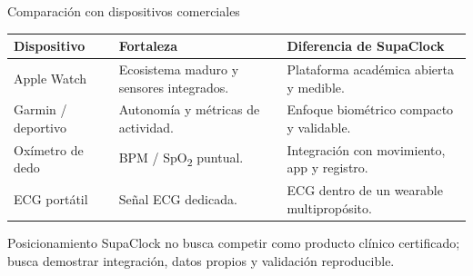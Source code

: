 \documentclass[aspectratio=169, 10pt]{beamer}
\begin{document}
\begin{frame}{Comparación con dispositivos comerciales}
    \scriptsize
    \centering
    \renewcommand{\arraystretch}{1.20}
    \begin{tabular}{p{2.5cm}p{3.1cm}p{5.9cm}}
        \toprule
        \textbf{Dispositivo} & \textbf{Fortaleza} & \textbf{Diferencia de SupaClock} \\
        \midrule
        Apple Watch & Ecosistema maduro y sensores integrados. & Plataforma académica abierta y medible. \\
        Garmin / deportivo & Autonomía y métricas de actividad. & Enfoque biométrico compacto y validable. \\
        Oxímetro de dedo & BPM / SpO\textsubscript{2} puntual. & Integración con movimiento, app y registro. \\
        ECG portátil & Señal ECG dedicada. & ECG dentro de un wearable multipropósito. \\
        \bottomrule
    \end{tabular}
    \vspace{0.35cm}
    \begin{block}{Posicionamiento}
        \scriptsize SupaClock no busca competir como producto clínico certificado; busca demostrar integración, datos propios y validación reproducible.
    \end{block}
\end{frame}
\end{document}
